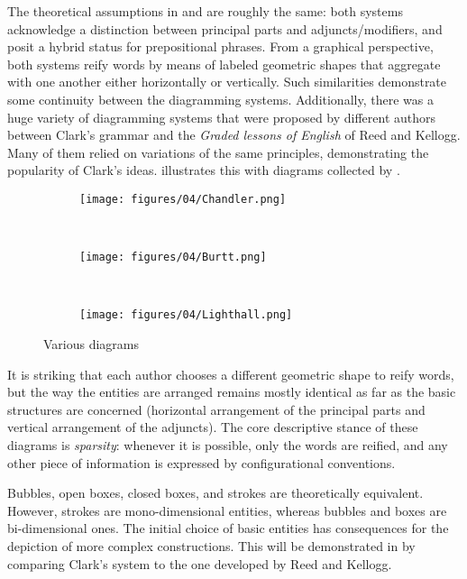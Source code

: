 \documentclass[english,output=paper,colorlinks,citecolor=brown]{../langscibook}
\begin{document}
The theoretical assumptions in \citet{Clark1847} and \citet{ReedBrainerd1879} are roughly the same: both systems acknowledge a distinction between principal parts and adjuncts/modifiers, and posit a hybrid status for prepositional phrases. From a graphical perspective, both systems reify words by means of labeled geometric shapes that aggregate with one another either horizontally or vertically. Such similarities demonstrate some continuity between the diagramming systems. Additionally, there was a huge variety of diagramming systems that were proposed by different authors between Clark’s grammar and the \textit{Graded lessons of English} of Reed and Kellogg. Many of them relied on variations of the same principles, demonstrating the popularity of Clark’s ideas.  illustrates this with diagrams collected by \citet[37, 56, 75]{Brittain1973}.

\begin{figure}
    \begin{subfigure}[t]{\linewidth}\centering
	    \caption{\citealt[153]{Chandler1862}}
	  	\texttt{[image: figures/04/Chandler.png]}
    \end{subfigure}\medskip\\%
    \begin{subfigure}[t]{\linewidth}\centering
	    \caption{\citealt[265]{Burtt1869}}
	  	\texttt{[image: figures/04/Burtt.png]}
    \end{subfigure}\medskip\\%
    \begin{subfigure}[t]{\linewidth}\centering
	    \caption{\citealt[51]{Lighthall1872}}
	  	\texttt{[image: figures/04/Lighthall.png]}
    \end{subfigure}
    \caption{Various diagrams\label{fig:4:4}}
 \end{figure}

It is striking that each author chooses a different geometric shape to reify words, but the way the entities are arranged remains mostly identical as far as the basic structures are concerned (horizontal arrangement of the principal parts and vertical arrangement of the adjuncts). The core descriptive stance of these diagrams is \textit{sparsity}: whenever it is possible, only the words are reified, and any other piece of information is expressed by configurational conventions.

Bubbles, open boxes, closed boxes, and strokes are theoretically equivalent. However, strokes are mono-dimensional entities, whereas bubbles and boxes are bi-dimensional ones. The initial choice of basic entities has consequences for the depiction of more complex constructions. This will be demonstrated in  by comparing Clark’s system to the one developed by Reed and Kellogg.
\end{document}
